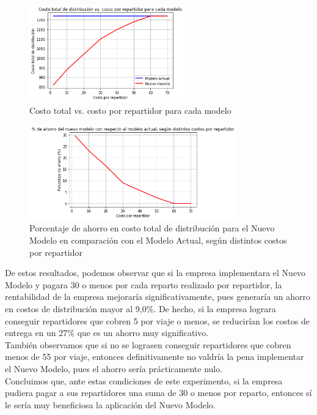 \documentclass{article}
\begin{document}
\begin{figure}[H] 
    \centering
    \includegraphics[width=0.6\textwidth]{costo_tot_vs_costo_rep.png}
    \caption{Costo total vs. costo por repartidor para cada modelo}
    \label{fig:mi-imagen}
\end{figure}


\begin{figure}[H] 
    \centering
    \includegraphics[width=0.8\textwidth]{porcentaje_ahorro_vs_costo_rep.png}
    \caption{Porcentaje de ahorro en costo total de distribución para el Nuevo Modelo en comparación con el Modelo Actual, según distintos costos por repartidor}
    \label{fig:mi-imagen}
\end{figure}

De estos resultados, podemos observar que si la empresa implementara el Nuevo Modelo y pagara 30 o menos por cada reparto realizado por repartidor, la rentabilidad de la empresa mejoraría significativamente, pues generaría un ahorro en costos de distribución mayor al 9,0\%. De hecho, si la empresa lograra conseguir repartidores que cobren 5 por viaje o menos, se reducirían los costos de entrega en un 27\% que es un ahorro muy significativo. \\
También observamos que si no se lograsen conseguir repartidores que cobren menos de 55 por viaje, entonces definitivamente no valdría la pena implementar el Nuevo Modelo, pues el ahorro sería prácticamente nulo. \\
Concluimos que, ante estas condiciones de este experimento, si la empresa pudiera pagar a sus repartidores una suma de 30 o menos por reparto, entonces sí le sería muy beneficiosa la aplicación del Nuevo Modelo. 
\end{document}
